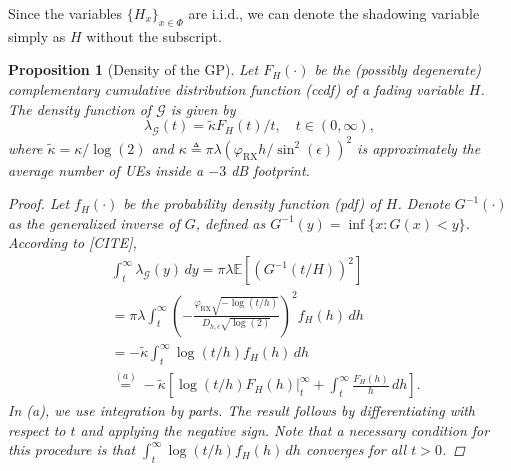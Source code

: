 \documentclass[lettersize,journal]{IEEEtran}
\newtheorem{prop}[theorem]{Proposition}
\begin{document}
Since the variables $\{H_x\}_{x \in \Phi}$ are i.i.d., we can denote the shadowing variable simply as $H$ without the subscript.
\begin{prop}[Density of the GP]
  Let $F_H(\cdot)$ be the (possibly degenerate) complementary cumulative distribution function (ccdf) of a fading variable $H$. The density function of $\mathcal{G}$ is given by
  \begin{equation}
    \label{eq:GPdensity}
    \lambda_{\mathcal{G}}(t) = \tilde{\kappa} {F_H(t)}/{t}, \quad t \in (0, \infty),
  \end{equation}
  where $\tilde{\kappa} = {\kappa}/{\log(2)}$ and $\kappa \triangleq \pi \lambda \left({\varphi_{\text{RX}}}h/{\sin^2(\epsilon)}\right)^2$ is approximately the average number of UEs inside a $-3$ dB footprint.

  
  \begin{proof}
    Let $f_H(\cdot)$ be the probability density function (pdf) of $H$. Denote $G^{-1}(\cdot)$ as the generalized inverse of $G$, defined as $G^{-1}(y) = \inf \{x : G(x) < y\}$. According to [CITE],
    \begin{align*}
      &\int_t^{\infty} \lambda_{\mathcal{G}}(y) \, dy = \pi \lambda \mathbb{E}\left[ \left({G^{-1}(t/H)}{}\right)^2 \right] \\
      &= \pi \lambda \int_t^{\infty} \left(-\frac{\varphi_{\text{RX}} \sqrt{-\log(t/h)}}{D_{h,\epsilon} \sqrt{\log(2)}}\right)^2 f_H(h) \, dh \\
      &= -\tilde{\kappa} \int_t^{\infty} \log(t/h) f_H(h) \, dh \\
      &\overset{(a)}{=} -\tilde{\kappa} \left[ \left. \log(t/h) F_H(h) \right|_t^{\infty} + \int_t^{\infty} \frac{F_H(h)}{h} \, dh \right].
    \end{align*}
    In (a), we use integration by parts. The result follows by differentiating with respect to $t$ and applying the negative sign. Note that a necessary condition for this procedure is that $\int_t^{\infty} \log(t/h) f_H(h) \, dh$ converges for all $t > 0$.
  \end{proof}
\end{prop}
\end{document}
